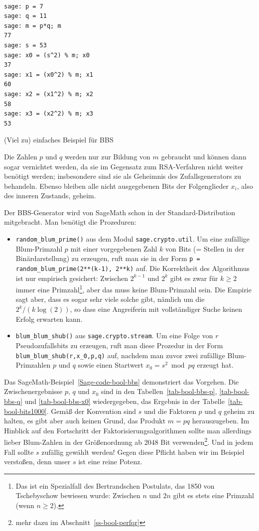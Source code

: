 \begin{refsegment}
\begin{sagecode}
\begin{verbatim}

sage: p = 7
sage: q = 11
sage: m = p*q; m
77
sage: s = 53
sage: x0 = (s^2) % m; x0
37
sage: x1 = (x0^2) % m; x1
60
sage: x2 = (x1^2) % m; x2
58
sage: x3 = (x2^2) % m; x3
53
\end{verbatim}
\caption{(Viel zu) einfaches Beispiel für BBS}\label{Sage-code-bool-BBStoy}
\end{sagecode}

Die Zahlen $p$ und $q$ werden nur zur Bildung von $m$ gebraucht und können
dann sogar vernichtet werden, da sie im Gegensatz zum RSA-Verfahren
nicht weiter benötigt werden; insbesondere sind sie als Geheimnis des
Zufallsgenerators zu behandeln. Ebenso bleiben alle nicht ausgegebenen
Bits der Folgenglieder $x_i$, also des inneren Zustands, geheim.

Der BBS-Generator wird von SageMath schon in der Standard-Distribution
mitgebracht. Man benötigt die Prozeduren:
\begin{itemize}
   \item {\tt random\_blum\_prime()} aus dem Modul {\tt sage.crypto.util}. Um
      eine zufällige Blum-Primzahl $p$ mit einer vorgegebenen Zahl $k$ von
      Bits (= Stellen in der Binärdarstellung) zu erzeugen, ruft man
      sie in der Form {\tt p = random\_blum\_prime(2**(k-1), 2**k)} auf.
      Die Korrektheit des Algorithmus ist nur empirisch gesichert:
      Zwischen $2^{k-1}$ und $2^k$ gibt es zwar für $k \geq 2$ immer eine
      Primzahl\footnote{%
      Das ist ein Spezialfall des Bertrandschen Postulats, das 1850 von
      Tschebyschow bewiesen wurde: Zwischen $n$ und $2n$ gibt es stets
      eine Primzahl (wenn $n \geq 2$).
      }, aber das muss keine Blum-Primzahl sein. Die Empirie sagt
      aber, dass es sogar sehr viele solche gibt, nämlich um die
      $2^k/(k \log(2))$, so dass eine Angreiferin mit vollständiger Suche
      keinen Erfolg erwarten kann.
   \item {\tt blum\_blum\_shub()} aus {\tt sage.crypto.stream}.
      Um eine Folge von $r$ Pseudozufallsbits zu erzeugen, ruft man diese
      Prozedur
      in der Form {\tt blum\_blum\_shub(r,x\_0,p,q)} auf, nachdem man zuvor
      zwei zufällige Blum-Primzahlen $p$ und $q$ sowie einen Startwert
      $x_0 = s^2 \bmod pq$ erzeugt hat.
\end{itemize}
Das SageMath-Beispiel~\ref{Sage-code-bool-bbs} demonstriert das Vorgehen.
Die Zwischenergebnisse $p$, $q$ und $x_0$ sind in den Tabellen~\ref{tab-bool-bbs-p},
\ref{tab-bool-bbs-q} und \ref{tab-bool-bbs-x0} wiedergegeben,
das Ergebnis in der Tabelle~\ref{tab-bool-bits1000}.
Gemäß der Konvention sind $s$ und die Faktoren $p$ und $q$ geheim zu
halten, es gibt aber auch keinen Grund, das Produkt $m = pq$ herauszugeben.
Im Hinblick auf den Fortschritt der Faktorisierungsalgorithmen sollte
man allerdings lieber Blum-Zahlen in der Größenordnung ab 2048 Bit
verwenden\footnote{%
   mehr dazu im Abschnitt~\ref{ss-bool-perfqr}
}.
Und in jedem Fall sollte $s$ zufällig gewählt werden! Gegen diese
Pflicht haben wir im Beispiel verstoßen, denn unser $s$ ist eine
reine Potenz.


\end{refsegment}
